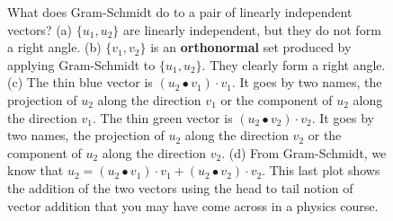 \begin{figure}[hbt!]%
\centering
{}%
\hspace{5pt}%
%
\hspace{5pt}%
%
\hspace{5pt}%
    \caption[]{What does Gram-Schmidt do to a pair of linearly independent vectors? (a) $\{u_1, u_2 \}$ are linearly independent, but they do not form a right angle. (b) $\{v_1, v_2 \}$ is an \textbf{orthonormal} set produced by applying Gram-Schmidt to $\{u_1, u_2 \}$. They clearly form a right angle. (c)  The thin blue vector is $(u_2 \bullet v_1)\cdot v_1$. It goes by two names, the projection of $u_2$ along the direction $v_1$ or the component of $u_2$ along the direction $v_1$. The thin green vector is $(u_2 \bullet v_2)\cdot v_2$. It goes by two names, the projection of $u_2$ along the direction $v_2$ or the component of $u_2$ along the direction $v_2$. (d) From Gram-Schmidt, we know that $u_2 = (u_2 \bullet v_1)\cdot v_1 +(u_2 \bullet v_2)\cdot v_2 $. This last plot shows the addition of the two vectors using the head to tail notion of vector addition that you may have come across in a physics course.}

\end{figure}
